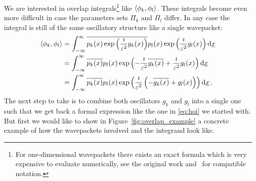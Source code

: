 \documentclass[a4paper,10pt]{article}
\begin{document}
We are interested in overlap integrals\footnote{For one-dimensional wavepackets there
exists an exact formula which is very expensive to evaluate numerically, see the original work
\cite{H_R_quantization_rules} and~\cite{B_bachelor_thesis} for compatible notation.} like
$\left\langle \phi_k , \phi_l \right\rangle$. These integrals become even more difficult in case the parameters
sets $\Pi_k$ and $\Pi_l$ differ. In any case the integral is still of the same oscillatory
structure like a single wavepacket:
\begin{equation}
\begin{split}
  \left\langle \phi_k , \phi_l \right\rangle & =
  \int_{-\infty}^{\infty} \overline{p_k(x)\exp\left(\frac{\imath}{\varepsilon^2} g_k(x)\right)}
                                p_l(x)\exp\left(\frac{\imath}{\varepsilon^2} g_l(x)\right)
  \mathrm{d}\underline{x} \\
  & =
  \int_{-\infty}^{\infty}
    \overline{p_k(x)} p_l(x)
    \exp\left(-\frac{\imath}{\varepsilon^2} \overline{g_k(x)} + \frac{\imath}{\varepsilon^2} g_l(x)\right)
  \mathrm{d}\underline{x} \\
  & =
  \int_{-\infty}^{\infty}
    \overline{p_k(x)} p_l(x)
    \exp\left(\frac{\imath}{\varepsilon^2}\left(-\overline{g_k(x)} + g_l(x)\right)\right)
  \mathrm{d}\underline{x} \,.
\end{split}
\end{equation}
The next step to take is to combine both oscillators $g_k$ and $g_l$ into a
single one such that we get back a formal expression like the one in
\eqref{eq:hoi} we started with. But first we would like to
show in Figure~\ref{fig:overlap_example} a concrete example of how the
wavepackets involved and the integrand look like.
\end{document}
